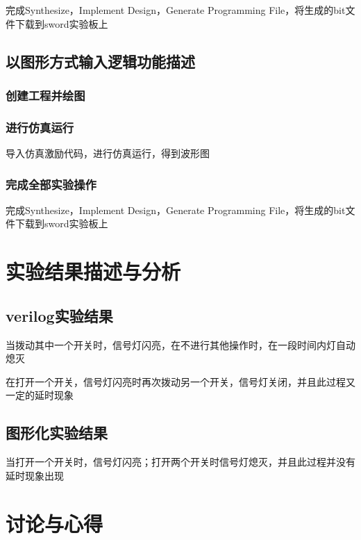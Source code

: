 \documentclass{article}
\begin{document}
完成Synthesize，Implement Design，Generate Programming File，将生成的bit文件下载到sword实验板上





\subsection{以图形方式输入逻辑功能描述}

\subsubsection{创建工程并绘图}


\subsubsection{进行仿真运行}

导入仿真激励代码，进行仿真运行，得到波形图


\subsubsection{完成全部实验操作}

完成Synthesize，Implement Design，Generate Programming File，将生成的bit文件下载到sword实验板上

\section{实验结果描述与分析}

\subsection{verilog实验结果}

当拨动其中一个开关时，信号灯闪亮，在不进行其他操作时，在一段时间内灯自动熄灭


在打开一个开关，信号灯闪亮时再次拨动另一个开关，信号灯关闭，并且此过程又一定的延时现象


\subsection{图形化实验结果}

当打开一个开关时，信号灯闪亮；打开两个开关时信号灯熄灭，并且此过程并没有延时现象出现





\section{讨论与心得}
\end{document}

